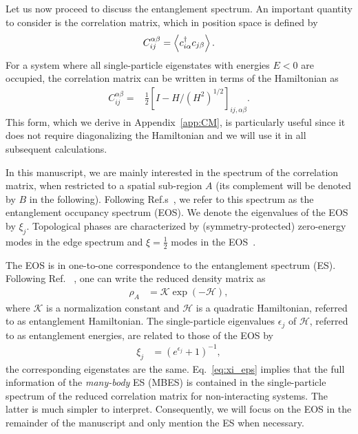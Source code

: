 \documentclass[twocolumn,amsmath,longbibliography,amssymb,superscriptaddress]{revtex4-1}
\begin{document}
Let us now proceed to discuss the entanglement spectrum. 
An important quantity to consider is the correlation matrix, which in position space is defined by
\begin{align}
C_{ij}^{\alpha \beta} = \expval{c_{i\alpha}^\dagger c_{j\beta}}.
\end{align}
For a system where all single-particle eigenstates with energies $E<0$ are occupied, the correlation matrix can be written  in terms of the Hamiltonian as
\begin{align}\label{eq:corr_mat2}
C_{ij}^{\alpha \beta} =& \frac{1}{2}\left[I - H/ (H^2)^{1/2} \right]_{ij, \alpha \beta}.
\end{align}
This form, which we derive in Appendix~\ref{app:CM}, is particularly useful since it does not require diagonalizing the Hamiltonian and we will use it in all subsequent calculations.

In this manuscript, we are mainly interested in the spectrum of the correlation matrix, when restricted to a spatial sub-region $A$ (its complement will be denoted by $B$ in the following). 
Following Ref.s~\cite{Huang2012,Huang2012-2}, we refer to this spectrum as the entanglement occupancy spectrum (EOS).
We denote the eigenvalues of the EOS by $\xi_j$. 
Topological phases are characterized by (symmetry-protected) zero-energy modes in the edge spectrum and $\xi=\frac 1 2$ modes in the EOS~\cite{Fidkowski2010entanglement}.
 

The EOS is in one-to-one correspondence to the entanglement spectrum (ES). 
Following Ref.~\cite{Peschel2003,Peschel2008} , one can write the  reduced density matrix as 
\begin{align}\label{eq:red_dens_mat}
\rho_A&=\mathcal{K} \exp(-\mathcal H),
\end{align}
where $\mathcal{K}$ is a normalization constant and $\mathcal{H}$ is a quadratic Hamiltonian, referred to as entanglement Hamiltonian. 
The single-particle eigenvalues $\epsilon_j$ of $\mathcal{H}$, referred to as entanglement energies,  are related to those of the EOS by 
\begin{align}\label{eq:xi_eps}
\xi_j &=\left(e^{\epsilon_j}+1\right)^{-1}, 
\end{align}
the corresponding eigenstates are the same. 
Eq.~\eqref{eq:xi_eps} implies that the full information of the \emph{many-body} ES (MBES) is contained in the single-particle spectrum of the reduced correlation matrix for non-interacting systems. 
The latter is much simpler to interpret. 
Consequently, we will focus on the EOS in the remainder of the manuscript and only mention the ES when necessary. 
\end{document}
